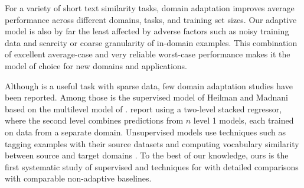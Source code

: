 




For a variety of short text similarity tasks, domain adaptation
improves average performance across different domains, tasks, and
training set sizes.  Our adaptive model is also by far the least
affected by adverse factors such as noisy training data and scarcity
or coarse granularity of in-domain examples.  This combination of
excellent average-case and very reliable worst-case performance makes
it the model of choice for new \sts{} domains and applications.

Although \sts{} is a useful task with sparse data, few domain adaptation
 studies have been reported.  
Among those is the supervised model of Heilman and Madnani
 based on the multilevel model of
.   report using a
two-level stacked regressor, where the second level combines
predictions from $n$ level 1 models, each trained on data from a
separate domain.  Unsupervised models use
 techniques such as tagging examples with their source
datasets \cite{Gella:2013,Severyn:2013} and computing vocabulary
similarity between source and target domains
\cite{Arora:2015}.  To the best of our knowledge, ours is the first systematic
study of supervised \da{} and \mtl{} techniques for \sts{} with
detailed comparisons with comparable non-adaptive baselines.
